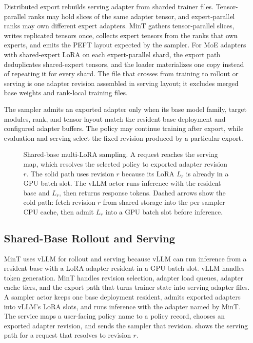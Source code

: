 Distributed export rebuilds serving adapter from sharded trainer files. Tensor-parallel ranks may hold slices of the same adapter tensor, and expert-parallel ranks may own different expert adapters. MinT gathers tensor-parallel slices, writes replicated tensors once, collects expert tensors from the ranks that own experts, and emits the PEFT layout expected by the sampler. For MoE adapters with shared-expert LoRA on each expert-parallel shard, the export path deduplicates shared-expert tensors, and the loader materializes one copy instead of repeating it for every shard. The file that crosses from training to rollout or serving is one adapter revision assembled in serving layout; it excludes merged base weights and rank-local training files.

The sampler admits an exported adapter only when its base model family, target modules, rank, and tensor layout match the resident base deployment and configured adapter buffers. The policy may continue training after export, while evaluation and serving select the fixed revision produced by a particular export.

\begin{figure}[H]
    \centering
    \resizebox{0.84\textwidth}{!}{}
\caption{Shared-base multi-LoRA sampling. A request reaches the serving map, which resolves the selected policy to exported adapter revision $r$. The solid path uses revision $r$ because its LoRA $L_r$ is already in a GPU batch slot. The vLLM actor runs inference with the resident base and $L_r$, then returns response tokens. Dashed arrows show the cold path: fetch revision $r$ from shared storage into the per-sampler CPU cache, then admit $L_r$ into a GPU batch slot before inference.}
    \label{fig:mint_system_blocks}
\end{figure}

\subsection{Shared-Base Rollout and Serving}

MinT uses vLLM for rollout and serving because vLLM can run inference from a resident base with a LoRA adapter resident in a GPU batch slot. vLLM handles token generation. MinT handles revision selection, adapter load queues, adapter cache tiers, and the export path that turns trainer state into serving adapter files. A sampler actor keeps one base deployment resident, admits exported adapters into vLLM's LoRA slots, and runs inference with the adapter named by MinT. The service maps a user-facing policy name to a policy record, chooses an exported adapter revision, and sends the sampler that revision.  shows the serving path for a request that resolves to revision $r$.

